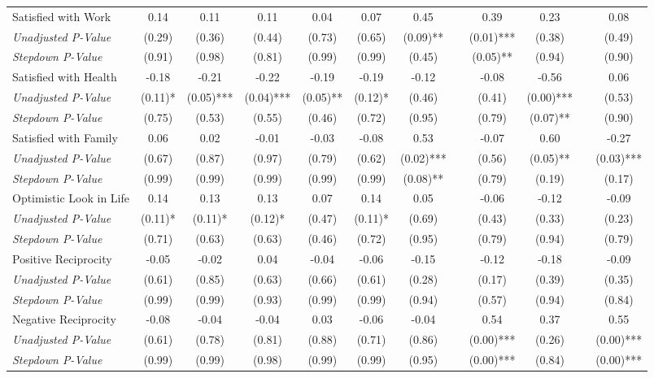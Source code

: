 \begin{tabular}{l c c c c c c c c c c c}
Satisfied with Work & 0.14 & 0.11 & 0.11 & 0.04 & 0.07 & 0.45 & & 0.39 & 0.23 & & 0.08 \\
\quad \textit{Unadjusted P-Value} & (0.29) & (0.36) & (0.44) & (0.73) & (0.65) & (0.09)** & & (0.01)*** & (0.38) & & (0.49) \\
\quad \textit{Stepdown P-Value} & (0.91) & (0.98) & (0.81) & (0.99) & (0.99) & (0.45) & & (0.05)** & (0.94) & & (0.90) \\
Satisfied with Health & -0.18 & -0.21 & -0.22 & -0.19 & -0.19 & -0.12 & & -0.08 & -0.56 & & 0.06 \\
\quad \textit{Unadjusted P-Value} & (0.11)* & (0.05)*** & (0.04)*** & (0.05)** & (0.12)* & (0.46) & & (0.41) & (0.00)*** & & (0.53) \\
\quad \textit{Stepdown P-Value} & (0.75) & (0.53) & (0.55) & (0.46) & (0.72) & (0.95) & & (0.79) & (0.07)** & & (0.90) \\
Satisfied with Family & 0.06 & 0.02 & -0.01 & -0.03 & -0.08 & 0.53 & & -0.07 & 0.60 & & -0.27 \\
\quad \textit{Unadjusted P-Value} & (0.67) & (0.87) & (0.97) & (0.79) & (0.62) & (0.02)*** & & (0.56) & (0.05)** & & (0.03)*** \\
\quad \textit{Stepdown P-Value} & (0.99) & (0.99) & (0.99) & (0.99) & (0.99) & (0.08)** & & (0.79) & (0.19) & & (0.17) \\
Optimistic Look in Life & 0.14 & 0.13 & 0.13 & 0.07 & 0.14 & 0.05 & & -0.06 & -0.12 & & -0.09 \\
\quad \textit{Unadjusted P-Value} & (0.11)* & (0.11)* & (0.12)* & (0.47) & (0.11)* & (0.69) & & (0.43) & (0.33) & & (0.23) \\
\quad \textit{Stepdown P-Value} & (0.71) & (0.63) & (0.63) & (0.46) & (0.72) & (0.95) & & (0.79) & (0.94) & & (0.79) \\
Positive Reciprocity & -0.05 & -0.02 & 0.04 & -0.04 & -0.06 & -0.15 & & -0.12 & -0.18 & & -0.09 \\
\quad \textit{Unadjusted P-Value} & (0.61) & (0.85) & (0.63) & (0.66) & (0.61) & (0.28) & & (0.17) & (0.39) & & (0.35) \\
\quad \textit{Stepdown P-Value} & (0.99) & (0.99) & (0.93) & (0.99) & (0.99) & (0.94) & & (0.57) & (0.94) & & (0.84) \\
Negative Reciprocity & -0.08 & -0.04 & -0.04 & 0.03 & -0.06 & -0.04 & & 0.54 & 0.37 & & 0.55 \\
\quad \textit{Unadjusted P-Value} & (0.61) & (0.78) & (0.81) & (0.88) & (0.71) & (0.86) & & (0.00)*** & (0.26) & & (0.00)*** \\
\quad \textit{Stepdown P-Value} & (0.99) & (0.99) & (0.98) & (0.99) & (0.99) & (0.95) & & (0.00)*** & (0.84) & & (0.00)*** \\
\bottomrule
\end{tabular}
